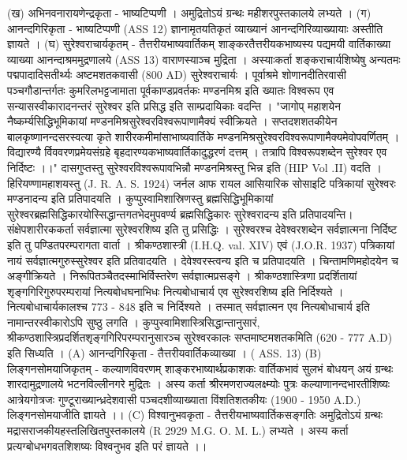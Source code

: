 (ख) अभिनवनारायणेन्द्रकृता - भाष्यटिप्पणी । अमुद्रितोऽयं ग्रन्थः महीशरपुस्तकालये लभ्यते । 
(ग) आनन्दगिरिकृता - भाष्यटिप्पणी (ASS 12) ज्ञानामृतयतिकृतं व्याख्यानं आनन्दगिरिव्याख्यायाः अस्तीति ज्ञायते ।
(घ) सुरेश्वराचार्यकृतम् - तैत्तरीयभाष्यवार्तिकम् 
शाङ्करतैत्तरीयकभाष्यस्य पद्यमयी वार्तिकाख्या व्याख्या आनन्दाश्रममुद्रणालये (ASS 13) वाराणस्याञ्च मुद्रिता । अस्याःकर्ता शङ्कराचार्यशिष्येषु अन्यतमः पद्मपादादिसतीर्थ्यः अष्टमशतकवासी (800 AD) सुरेश्वराचार्यः । 
पूर्वाश्रमे शोणानदीतिरवासी पञ्चगौडान्तर्गतः कुमरिलभट्टजामाता पूर्वकाण्डप्रवर्तकः मण्डनमिश्र इति ख्यातः विश्वरूप एव सन्यासस्वीकारादनन्तरं सुरेश्वर इति प्रसिद्ध इति साम्प्रदायिकाः वदन्ति । 
"जागोप् महाशयेन नैष्कर्म्यसिद्धिभूमिकायां मण्डनमिश्रसुरेश्वरविश्वरूपाणामैक्यं स्वीक्रियते । सप्तदशशतकीयेन बालकृष्णानन्दसरस्वत्या कृते शारीरकमीमांसाभाष्यवार्तिके मण्डनमिश्रसुरेश्वरविश्वरूपाणामैक्यमेवोपवर्णितम् । विद्यारण्यै र्विववरणप्रमेयसंग्रहे बृहदारण्यकभाष्यवार्तिकादुद्धरणं दत्तम् । तत्रापि विश्वरूपशब्देन सुरेश्वर एव निर्दिष्टः ।।"
दासगुप्तस्तु सुरेश्वरविश्वरूपावभिन्नौ मण्डनमिश्रस्तु भिन्न इति (HIP Vol .II) वदति । हिरियण्णामहाशयस्तु (J. R. A. S. 1924)  जर्नल आफ रायल आसियारिक सोसाइटि पत्रिकायां सुरेश्वरः मण्डनादन्य इति प्रतिपादयति । 
कुप्पुस्वामिशास्रिणस्तु ब्रह्मसिद्धिभूमिकायां सुरेश्वरब्रह्मसिद्धिकारयोस्सिद्धान्तगतभेदमुपवर्ण्य ब्रह्मसिद्धिकारः सुरेश्वरादन्य इति प्रतिपादयन्ति। 
संक्षेपशारीरककर्ता सर्वज्ञात्मा सुरेश्वरशिष्य इति तु प्रसिद्धिः । सुरेश्वरश्च देवेश्वरशब्देन सर्वज्ञात्मना निर्दिष्ट इति तु पण्डितपरम्परागता वार्ता । 
श्रीकण्ठशास्त्री (I.H.Q. val. XIV) एवं (J.O.R. 1937) पत्रिकायां नायं सर्वज्ञात्मगुरुस्सुरेश्वर इति प्रतिवादयति । देवेश्वरस्त्वन्य इति च प्रतिपादयति । चिन्तामणिमहोदयेन च अङ्गीक्रियते । निरूपितञ्चैतदस्माभिर्विस्तरेण सर्वज्ञात्मप्रसङ्गे । 
श्रीकण्ठशास्त्रिणा प्रदर्शितायां शृङ्गगिरिगुरुपरम्परायां नित्यबोधघनाभिधः नित्यबोधाचार्य एव सुरेश्वरशिष्य इति निर्दिश्यते । नित्यबोधाचार्यकालश्च 773 - 848  इति च निर्दिश्यते । तस्मात् सर्वज्ञात्मन एव नित्यबोधाचार्य इति नामान्तरस्वीकारोऽपि सुष्ठु लगति । 
कुप्पुस्वामिशास्त्रिसिद्धान्तानुसारं, श्रीकण्ठशास्त्रिप्रदर्शितशृङ्गगिरिपरम्परानुसारञ्च सुरेश्वरकालः सप्तमाष्टमशतकमिति (620 - 777 A.D) इति सिध्यति । 
(A)  आनन्दगिरिकृता - तैत्तरीयवार्तिकव्याख्या । ( ASS. 13) 
(B)  लिङ्गनसोमयाजिकृतम् - कल्याणविवरणम् 
शाङ्करभाष्यार्थप्रकाशकः वार्तिकभावं सुलभं बोधयन् अयं ग्रन्थः शारदामुद्रणालये भटनविल्लीनगरे मुद्रितः । 
अस्य कर्ता श्रीरमणराज्यलक्ष्म्योः पुत्रः कल्याणानन्दभारतीशिष्यः आत्रेयगोत्रजः गुण्टूराख्यान्ध्रदेशवासी पञ्चदशीव्याख्याता विंशतिशतकीयः  (1900 - 1950 A.D.) लिङ्गनसोमयाजीति ज्ञायते ।। 
(C) विश्वानुभवकृता - तैत्तरीयभाष्यवार्तिकसङ्गतिः 
अमुद्रितोऽयं ग्रन्थः मद्रासराजकीयहस्तलिखितपुस्तकालये (R 2929 M.G. O. M. L.) लभ्यते । अस्य कर्ता प्रत्यग्बोधभगवतशिशष्यः विश्वनुभव इति परं ज्ञायते ।।
